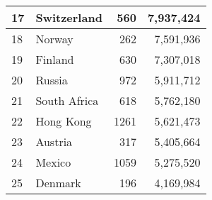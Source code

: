 \begin{table}[p]
\begin{center}
\begin{tabular}{|l||l|r|r|}
17      &       Switzerland     &       560     &       7,937,424       \tabularnewline \hline
18      &       Norway  		&       262     &       7,591,936       \tabularnewline \hline
19      &       Finland 		&       630     &       7,307,018       \tabularnewline \hline
20      &       Russia  		&       972     &       5,911,712       \tabularnewline \hline
21      &       South Africa    &       618     &       5,762,180       \tabularnewline \hline
22      &       Hong Kong       &       1261    &       5,621,473       \tabularnewline \hline
23      &       Austria 		&       317     &       5,405,664       \tabularnewline \hline
24      &       Mexico  		&       1059    &       5,275,520       \tabularnewline \hline
25      &       Denmark 		&       196     &       4,169,984       \tabularnewline \hline
	\end{tabular}
	\end{center}
	\ \newline\ \newline
\end{table}
	
